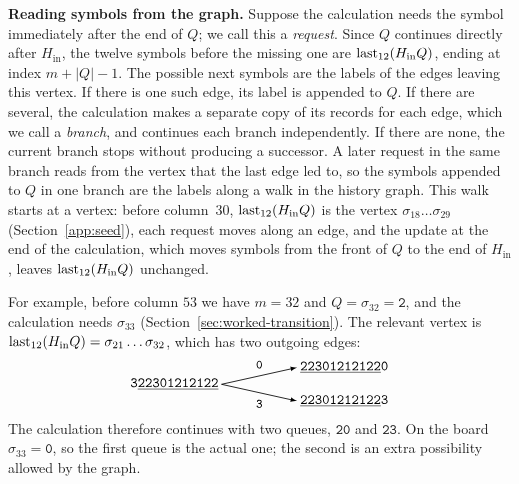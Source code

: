 \medskip\noindent
\textbf{Reading symbols from the graph.}
Suppose the calculation needs the symbol immediately after the end
of $Q$; we call this a \emph{request}. Since $Q$ continues directly
after $H_{\mathrm{in}}$, the twelve symbols before the missing one
are $\operatorname{last}_{12}(H_{\mathrm{in}}Q)$, ending at index $m+|Q|-1$. The
possible next symbols are the labels of the edges leaving this
vertex. If there is one such edge, its label is appended to $Q$. If
there are several, the calculation makes a separate copy of its
records for each edge, which we call a \emph{branch}, and continues
each branch independently. If there are none, the current branch
stops without producing a successor. A later request in the same
branch reads from the vertex that the last edge led to, so the
symbols appended to $Q$ in one branch are the labels along a walk in
the history graph. This walk starts at a vertex: before column~$30$,
$\operatorname{last}_{12}(H_{\mathrm{in}}Q)$ is the vertex $\sigma_{18}\dots\sigma_{29}$
(Section~\ref{app:seed}), each request
moves along an edge, and the update at the end of the calculation,
which moves symbols from the front of $Q$ to the end of
$H_{\mathrm{in}}$, leaves $\operatorname{last}_{12}(H_{\mathrm{in}}Q)$ unchanged.

For example, before column $53$ we have $m=32$ and
$Q=\sigma_{32}=\mathtt{2}$, and the calculation needs $\sigma_{33}$
(Section~\ref{sec:worked-transition}). The relevant vertex is
$\operatorname{last}_{12}(H_{\mathrm{in}}Q)=\sigma_{21}\dots\sigma_{32}$, which has two
outgoing edges:
\[
 \begin{tikzpicture}[baseline=(source.base),>=latex]
  \node[anchor=east,inner sep=2pt] (source) at (0,0)
    {\texttt{3\underline{22301212122}}};
  \node[anchor=west,inner sep=2pt] (zero) at (1.9,.42)
    {\texttt{\underline{22301212122}0}};
  \node[anchor=west,inner sep=2pt] (three) at (1.9,-.42)
    {\texttt{\underline{22301212122}3}};
  \draw[->,semithick] (source.east) --
    node[midway,above=4pt,inner sep=1pt,font=\small] {\texttt{0}} (zero.west);
  \draw[->,semithick] (source.east) --
    node[midway,below=4pt,inner sep=1pt,font=\small] {\texttt{3}} (three.west);
 \end{tikzpicture}
\]
The calculation therefore continues with two queues, $\mathtt{20}$
and $\mathtt{23}$. On the board $\sigma_{33}=\mathtt{0}$, so the first queue
is the actual one; the second is an extra possibility allowed by
the graph.

